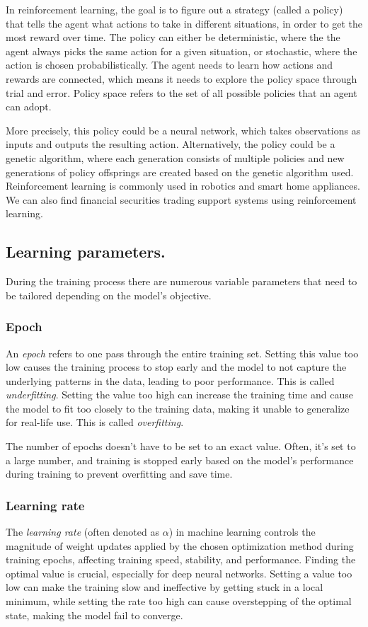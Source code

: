 \documentclass[a4paper,oneside,onecolumn,12pt]{book}
\begin{document}
		In reinforcement learning, the goal is to figure out a strategy (called a policy) that tells the agent what actions to take in different situations, in order to get the most reward over time. The policy can either be deterministic, where the the agent always picks the same action for a given situation, or stochastic, where the action is chosen probabilistically. The agent needs to learn how actions and rewards are connected, which means it needs to explore the policy space through trial and error. Policy space refers to the set of all possible policies that an agent can adopt. \cite{RLRAS}

		More precisely, this policy could be a neural network, which takes observations as inputs and outputs the resulting action. Alternatively, the policy could be a genetic algorithm, where each generation consists of multiple policies and new generations of policy offsprings are created based on the genetic algorithm used. Reinforcement learning is commonly used in robotics and smart home appliances. We can also find financial securities trading support systems using reinforcement learning. \cite{HMLSKT}

	\subsection{Learning parameters.}
	During the training process there are numerous variable parameters that need to be tailored depending on the model's objective.
		\subsubsection{Epoch}
		An \textit{epoch} refers to one pass through the entire training set. Setting this value too low causes the training process to stop early and the model to not capture the underlying patterns in the data, leading to poor performance. This is called \textit{underfitting}. Setting the value too high can increase the training time and cause the model to fit too closely to the training data, making it unable to generalize for real-life use. This is called \textit{overfitting}. \cite{WIEML}

		The number of epochs doesn't have to be set to an exact value. Often, it's set to a large number, and training is stopped early based on the model's performance during training to prevent overfitting and save time.

		\subsubsection{Learning rate}
		The \textit{learning rate} (often denoted as $\alpha$) in machine learning controls the magnitude of weight updates applied by the chosen optimization method during training epochs, affecting training speed, stability, and performance. Finding the optimal value is crucial, especially for deep neural networks. Setting a value too low can make the training slow and ineffective by getting stuck in a local minimum, while setting the rate too high can cause overstepping of the optimal state, making the model fail to converge. \cite{MML}
\end{document}
